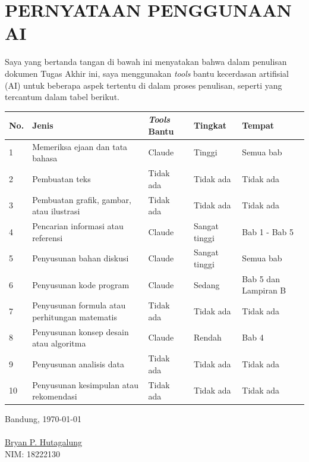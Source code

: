 \chapter*{PERNYATAAN PENGGUNAAN AI}
Saya yang bertanda tangan di bawah ini menyatakan bahwa dalam penulisan dokumen Tugas Akhir ini,
saya menggunakan \textit{tools} bantu kecerdasan artifisial (AI) untuk beberapa aspek tertentu di dalam proses penulisan,
seperti yang tercantum dalam tabel berikut.
\begin{table}[h]
\setlength{\tabcolsep}{3pt}
\begin{tabular}{|p{0.75cm}| p{4cm} | p{2.5cm} | p{2.5cm} | p{3cm} @{}| }
\hline
\centering\arraybackslash\textbf{No.} & \centering\arraybackslash\textbf{Jenis} & \centering\arraybackslash\textbf{\textit{Tools} Bantu} & \centering\arraybackslash\textbf{Tingkat} & \centering\arraybackslash\textbf{Tempat}\\
\hline
1 & Memeriksa ejaan dan tata bahasa & Claude & Tinggi & Semua bab \\
\hline
2 & Pembuatan teks & Tidak ada & Tidak ada & Tidak ada \\
\hline
3 & Pembuatan grafik, gambar, atau ilustrasi & Tidak ada & Tidak ada & Tidak ada \\
\hline
4 & Pencarian informasi atau referensi & Claude & Sangat tinggi & Bab 1 - Bab 5 \\
\hline
5 & Penyusunan bahan diskusi & Claude & Sangat tinggi & Semua bab \\
\hline
6 & Penyusunan kode program & Claude & Sedang & Bab 5 dan Lampiran B \\
\hline
7 & Penyusunan formula atau perhitungan matematis & Tidak ada & Tidak ada & Tidak ada \\
\hline
8 & Penyusunan konsep desain atau algoritma & Claude & Rendah & Bab 4 \\
\hline
9 & Penyusunan analisis data & Tidak ada & Tidak ada & Tidak ada \\
\hline
10 & Penyusunan kesimpulan atau rekomendasi & Tidak ada & Tidak ada & Tidak ada \\
\hline
\end{tabular}
\end{table}


Bandung, \today\\
\\[2cm]

\underline{Bryan P. Hutagalung} \\
NIM: 18222130
